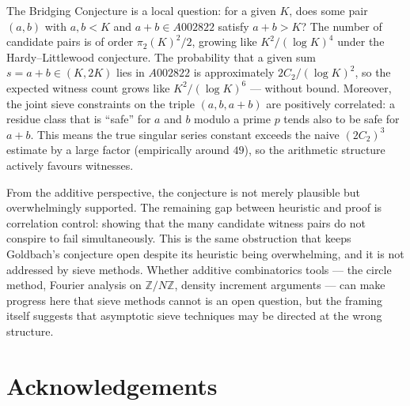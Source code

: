\documentclass[12pt]{amsart}
\theoremstyle{definition}
\begin{document}
The Bridging Conjecture is a local question: for a given $K$, does some pair
$(a, b)$ with $a, b < K$ and $a + b \in A002822$ satisfy $a + b > K$? The number
of candidate pairs is of order $\pi_2(K)^2/2$, growing like $K^2/(\log K)^4$ under
the Hardy--Littlewood conjecture. The probability that a given sum $s = a + b \in
(K, 2K)$ lies in $A002822$ is approximately $2C_2/(\log K)^2$, so the expected
witness count grows like $K^2/(\log K)^6$ — without bound. Moreover, the joint
sieve constraints on the triple $(a, b, a+b)$ are positively correlated: a residue
class that is ``safe'' for $a$ and $b$ modulo a prime $p$ tends also to be safe for
$a + b$. This means the true singular series constant exceeds the naive $(2C_2)^3$
estimate by a large factor (empirically around $49$), so the arithmetic structure
actively favours witnesses.

From the additive perspective, the conjecture is not merely plausible but
overwhelmingly supported. The remaining gap between heuristic and proof is
correlation control: showing that the many candidate witness pairs do not conspire
to fail simultaneously. This is the same obstruction that keeps Goldbach's conjecture
open despite its heuristic being overwhelming, and it is not addressed by sieve
methods. Whether additive combinatorics tools — the circle method, Fourier analysis
on $\mathbb{Z}/N\mathbb{Z}$, density increment arguments — can make progress here
that sieve methods cannot is an open question, but the framing itself suggests that
asymptotic sieve techniques may be directed at the wrong structure.

\section*{Acknowledgements}

\end{document}
